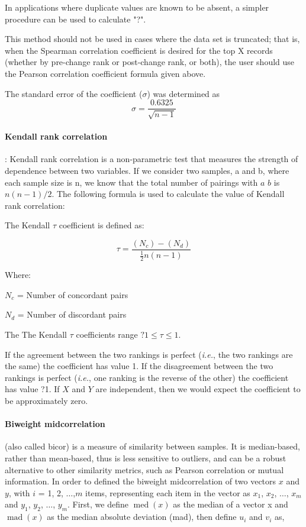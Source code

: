 \documentclass[a4paper]{article}
\begin{document}
In applications where duplicate values are known to be absent, a simpler procedure can be used to calculate "?".

This method should not be used in cases where the data set is truncated; that is, when the Spearman correlation coefficient is desired for the top X records (whether by pre-change rank or post-change rank, or both), the user should use the Pearson correlation coefficient formula given above.

The standard error of the coefficient ($\sigma$) was determined as
\begin{equation}
\sigma = \frac{ 0.6325 }{\sqrt{n-1}}
\end{equation}
 
\paragraph{Kendall rank correlation}: Kendall rank correlation is a non-parametric test that measures the strength of dependence between two variables.  If we consider two samples, a and b, where each sample size is n, we know that the total number of pairings with $a$ $b$ is $n(n-1)/2$.  The following formula is used to calculate the value of Kendall rank correlation:

The Kendall $\tau$ coefficient is defined as:

\begin{equation}
\tau = \frac{(N_c) - (N_d)}{\frac{1}{2} n (n-1)}
\end{equation}

Where:

$N_c$ = Number of concordant pairs 

$N_d$ = Number of discordant pairs

The The Kendall $\tau$ coefficients range $ ?1 \leq \tau \leq  1$.

If the agreement between the two rankings is perfect (\textit{i.e.}, the two rankings are the same) the coefficient has value 1.
If the disagreement between the two rankings is perfect (\textit{i.e.}, one ranking is the reverse of the other) the coefficient has value ?1. %
If $X$ and $Y$ are independent, then we would expect the coefficient to be approximately zero.

\paragraph{Biweight midcorrelation} (also called bicor) is a measure of similarity between samples. It is median-based, rather than mean-based, thus is less sensitive to outliers, and can be a robust alternative to other similarity metrics, such as Pearson correlation or mutual information.
In order to defined the biweight midcorrelation \citep{wilcox2012introduction} of two vectors $x$ and $y$, with $i$ = 1, 2, $\ldots$,$m$ items, representing each item in the vector as $x_{1}$, $x_{2}$, $\ldots$, $x_{m}$ and $y_{1}$, $y_{2}$, $\ldots$, $y_{m}$. First, we define $\operatorname{med}(x)$ as the median of a vector x and $\operatorname{mad}(x)$ as the median absolute deviation (mad), then define $u_{i}$ and $v_{i}$ as,
\end{document}

